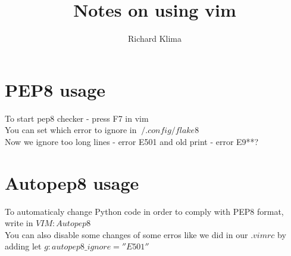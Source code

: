 \documentclass[a4paper]{article}
\title{Notes on using vim}
\author{Richard Klima}
\begin{document}
\maketitle
\section{PEP8 usage}
To start pep8 checker - press F7 in vim\\
You can set which error to ignore in $~/.config/flake8$\\
Now we ignore too long lines - error E501 and old print - error E9**?

\section{Autopep8 usage}
To automaticaly change Python code in order to comply with PEP8 format, write in $VIM :Autopep8$\\
You can also disable some changes of some erros like we did in our $.vimrc$ by adding let $g:autopep8\_ignore=''E501''$  

\end{document}
